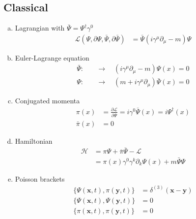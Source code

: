 \documentclass[10pt,a4paper]{report}
\theoremstyle{definition}
\begin{document}
\subsection{Classical}
\begin{enumerate}[a)]
\item Lagrangian with $\bar{\Psi}=\Psi^\dagger\gamma^0$
\begin{align}
\mathcal{L}(\Psi,\partial\Psi,\bar{\Psi},\partial\bar{\Psi})
&=\bar{\Psi}(i\gamma^\mu\partial_\mu-m)\Psi
\end{align}
\item Euler-Lagrange equation
\begin{align}
\bar{\Psi}:\quad&\rightarrow\quad(i\gamma^\mu\partial_\mu-m)\Psi(x)=0\\
\Psi:\quad&\rightarrow\quad(m+i\gamma^\mu\partial_\mu)\bar{\Psi}(x)=0
\end{align}
\item Conjugated momenta
\begin{align}
\pi(x)&=\frac{\partial\mathcal{L}}{\partial\dot{\Psi}}=i\gamma^0\bar{\Psi}(x)=i\Psi^\dagger(x)\\
\bar{\pi}(x)&=0
\end{align}
\item Hamiltonian
\begin{align}
\mathcal{H}
&=\pi\Psi+\bar{\pi}\bar{\Psi}-\mathcal{L}\\
&=\pi(x)\gamma^0\gamma^k\partial_k\Psi(x)+m\bar{\Psi}\Psi
\end{align}
\item Poisson brackets
\begin{align}
\{\Psi(\mathbf{x},t),\pi(\mathbf{y},t)\}&=\delta^{(3)}(\mathbf{x}-\mathbf{y})\\
\{\Psi(\mathbf{x},t),\Psi(\mathbf{y},t)\}&=0\\
\{\pi(\mathbf{x},t),\pi(\mathbf{y},t)\}&=0
\end{align}


\end{enumerate}
\end{document}
